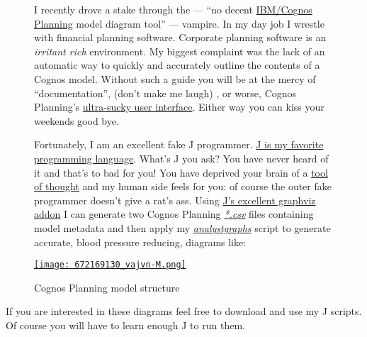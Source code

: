 \captionsetup[figure]{labelformat=empty}
\begin{figure}[ht]
\begin{minipage}[b]{0.56\textwidth}
\setlength{\parindent}{\minindent}
I recently drove a stake through the --- ``no decent
\href{http://www-01.ibm.com/software/data/cognos/products/cognos-8-planning/}{IBM/Cognos
Planning} model diagram tool'' --- vampire. In my day job I wrestle with
financial planning software. Corporate planning software is an
\emph{irritant rich} environment. My biggest complaint was the lack of an
automatic way to quickly and accurately outline the contents of a Cognos
model. Without such a guide you will be at the mercy of
``documentation'', (don't make me laugh) , or worse, Cognos Planning's
\href{http://www.buigallery.com/}{ultra-sucky user interface}. Either
way you can kiss your weekends good bye.

Fortunately, I am an excellent fake J programmer.
\href{http://www.jsoftware.com/}{J is my favorite programming language}.
What's J you ask? You have never heard of it and that's to bad for you!
You have deprived your brain of a
\href{http://en.wikipedia.org/wiki/Kenneth\_E.\_Iverson}{tool of
thought} and my human side feels for you: of course the outer fake
programmer doesn't give a rat's ass. Using
\href{http://www.jsoftware.com/jwiki/Addons/graphics/graphviz}{J's
excellent graphviz addon} I can generate two Cognos Planning
\emph{\href{http://www.fileinfo.com/extension/csv}{*.csv}} files
containing model metadata and then apply my
\emph{\href{http://www.box.net/shared/7mqg9bek5x}{analystgraphs}} script
to generate accurate, blood pressure reducing, diagrams like:
\end{minipage}
\hspace{1pt}
\begin{minipage}[b]{0.45\textwidth}
\centering
\href{http://conceptcontrol.smugmug.com/Other/utilimages/8074217\_BQjXN/1/\#672169130\_vajvn-A-LB}{\texttt{[image: 672169130\_vajvn-M.png]}}
\caption{Cognos Planning model structure}
\label{fig:1698X1}
\end{minipage}
\end{figure}


If you are interested in these diagrams feel free to download and use my
J scripts. Of course you will have to learn enough J to run them.



%